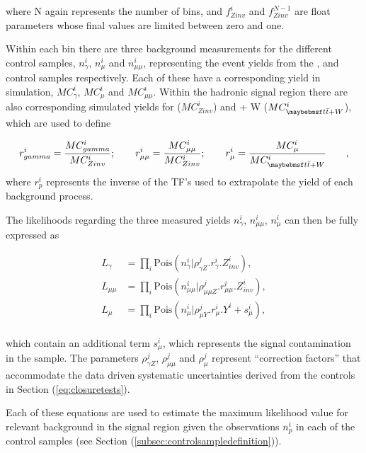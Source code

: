 where N again represents the number of \theht bins, and $f^{i}_{Zinv}$ and $f^{N-1}_{Zinv}$ are float parameters whose final values are limited between zero and one. 

Within each \theht bin there are three background measurements for the different control samples, $n^{i}_{\gamma}$, $n^{i}_{\mu}$ and $n^{i}_{\mu\mu}$, representing the event yields from the \gpjets, \mupjets and \dimupjets control samples respectively. Each of these have a corresponding yield in simulation, $MC^{i}_{\gamma}$, $MC^{i}_{\mu}$ and $MC^{i}_{\mu\mu}$.  Within the hadronic signal region there are also corresponding simulated yields for \zinv ($MC^{i}_{Zinv}$) and \ttbar + W ($MC^{i}_{\ttbar+W}$), which are used to define

\begin{equation}
r^{i}_{\gamma} = \frac{MC^{i}_{\gamma}}{MC^{i}_{Zinv}}; \qquad r^{i}_{\mu\mu} = \frac{MC^{i}_{\mu\mu}}{MC^{i}_{Zinv}}; \qquad r^{i}_{\mu} = \frac{MC^{i}_{\mu}}{MC^{i}_{\ttbar + W}} \qquad,
\end{equation}
where $r^{i}_{p}$ represents the inverse of the \ac{TF}'s used to extrapolate the yield of each background process.

The likelihoods regarding the three measured yields $n^{i}_{\gamma}$, $n^{i}_{\mu\mu}$, $n^{i}_{\mu}$ can then be fully expressed as

\begin{align}
L_{\gamma} &= \prod_{i} \text{Pois} (n^{i}_{\gamma} | \rho^{j}_{\gamma Z} . r^{i}_{\gamma} . Z^{i}_{inv}), \\
L_{\mu\mu} &= \prod_{i} \text{Pois} (n^{i}_{\mu\mu} | \rho^{j}_{\mu\mu Z} . r^{i}_{\mu\mu} . Z^{i}_{inv}), \\
L_{\mu} &= \prod_{i} \text{Pois} (n^{i}_{\mu} | \rho^{j}_{\mu Y} . r^{i}_{\mu} . Y^{i} + s^{i}_{\mu}), \\
\end{align}

which contain an additional term $s^{i}_{\mu}$, which represents the signal contamination in the \mupjets sample. The parameters $\rho^{j}_{\gamma Z}$, $\rho^{j}_{\mu\mu}$ and $\rho^{j}_{\mu}$ represent ``correction factors'' that accommodate the data driven systematic uncertainties derived from the controls in Section (\ref{eq:closuretests}). 

Each of these equations are used to estimate the maximum likelihood value for relevant background in the signal region given the observations $n^{i}_{p}$ in each of the control samples (see Section (\ref{subsec:controlsampledefinition})).

